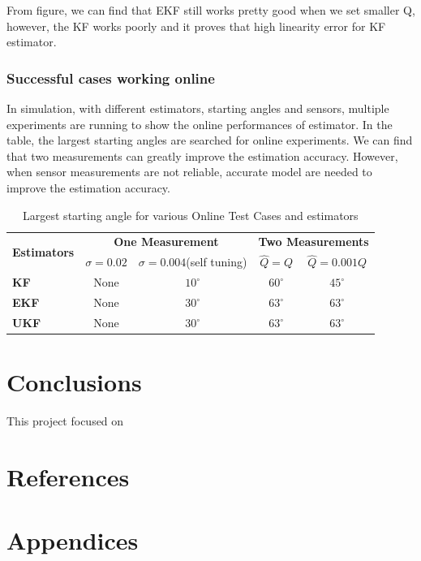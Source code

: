 \documentclass{article}
\begin{document}
From figure, we can find that EKF still works pretty good when we set smaller Q, however, the KF works poorly and it proves that high linearity error for KF estimator.
\subsubsection{Successful cases working online}
In simulation, with different estimators, starting angles and sensors, multiple experiments are running to show the online performances of estimator. In the table, the largest starting angles are searched for online experiments. We can find that two measurements can greatly improve the estimation accuracy. However, when sensor measurements are not reliable, accurate model are needed to improve the estimation accuracy.
\begin{table}[h!]
	\centering
	\renewcommand{\arraystretch}{1.5}
	\begin{tabular}{ |l |c  |c |c | c|}
		\hline
		\multirow{2}{*}{\textbf{Estimators}} & \multicolumn{2}{|c|}{\textbf{One Measurement}} & \multicolumn{2}{|c|}{\textbf{Two Measurements}} \\ \cline{2-5}
		& $\sigma = 0.02$ & $\sigma=0.004$(self tuning) & $\hat{Q} = Q$ & $\hat{Q} = 0.001Q$ \\ \hline
		\textbf{KF} & None & $10^\circ{}$ & $60^\circ{}$ & $45^\circ{}$ \\ \hline
		\textbf{EKF} & None & $30^\circ{}$ & $63^\circ{}$ & $63^\circ{}$ \\ \hline
		\textbf{UKF} & None & $30^\circ{}$ & $63^\circ{}$ & $63^\circ{}$ \\ \hline
	\end{tabular}
	\caption{Largest starting angle for various Online Test Cases and estimators}
	\label{table:offlinecases}
\end{table}


\section{Conclusions}
This project focused on 

\section{References}

{}


\pagebreak
\section{Appendices}
\end{document}
